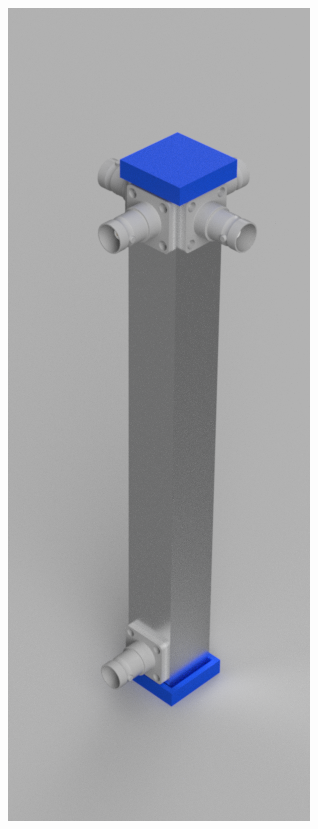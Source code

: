 \begin{figure}[H]
	\centering
	\begin{minipage}[b]{.2\linewidth} %
		\includegraphics[width=\linewidth]{../ref/Lambda_4-Anpasstopf v1.png}

\end{minipage}
\end{figure}
